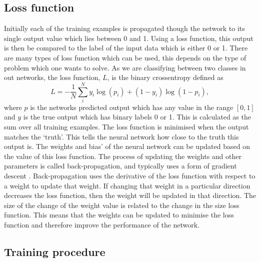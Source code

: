 \subsection{Loss function}

%
Initially each of the training examples is propagated though the network to its single output value which lies between 0 and 1. Using a loss function, this output is then be compared to
the label of the input data which is either 0 or 1. There are many types of loss function which can be used, this depends on the type of problem which one wants to solve. As we are classifying
between two classes in out networks, the loss function, $L$, is the binary
crossentropy defined as
%
\begin{equation}\label{cnn:loss} 
L = -\frac{1}{N} \sum_{i}^{N} y_i\log{(p_i)} + (1-y_i)\log{(1-p_i)},
\end{equation}
%
where $p$ is the networks predicted output which has any value in the range $[0,1]$ and $y$ is the true output which has binary labels 0 or 1. This is calculated as the sum over all training examples. 
The loss function is minimised when the output matches the `truth'. This
tells the neural network how close to the truth this output is. The weights and bias' of
the neural network can be updated based on the value of this loss function. The
process of updating the weights and other parameters is called back-propagation,
and typically uses a form of gradient descent
\cite{kingma2015AdamMethod}.
Back-propagation uses the derivative of the loss function with respect to a weight to update that weight.
If changing that weight in a particular direction decreases the loss function, then the weight will be updated in that direction.
The size of the change of the weight value is related to the change in the size loss function.
This means that the weights can be updated to minimise the loss function and therefore improve the performance of the network.

\subsection{Training procedure}

